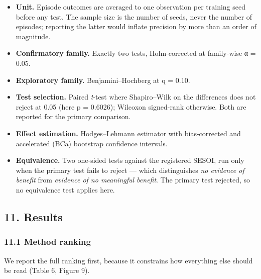 \documentclass[
]{article}
\providecommand{\tightlist}{%
  \setlength{\itemsep}{0pt}\setlength{\parskip}{0pt}}
\begin{document}
\begin{itemize}
\tightlist
\item
  \textbf{Unit.} Episode outcomes are averaged to one observation per
  training seed before any test. The sample size is the number of seeds,
  never the number of episodes; reporting the latter would inflate
  precision by more than an order of magnitude.
\item
  \textbf{Confirmatory family.} Exactly two tests, Holm-corrected at
  family-wise α = 0.05.
\item
  \textbf{Exploratory family.} Benjamini--Hochberg at q = 0.10.
\item
  \textbf{Test selection.} Paired \emph{t}-test where Shapiro--Wilk on
  the differences does not reject at 0.05 (here p = 0.6026); Wilcoxon
  signed-rank otherwise. Both are reported for the primary comparison.
\item
  \textbf{Effect estimation.} Hodges--Lehmann estimator with
  bias-corrected and accelerated (BCa) bootstrap confidence intervals.
\item
  \textbf{Equivalence.} Two one-sided tests against the registered
  SESOI, run only when the primary test fails to reject --- which
  distinguishes \emph{no evidence of benefit} from \emph{evidence of no
  meaningful benefit}. The primary test rejected, so no equivalence test
  applies here.
\end{itemize}

\subsection{11. Results}\label{11-results}

\subsubsection{11.1 Method ranking}\label{111-method-ranking}

We report the full ranking first, because it constrains how everything
else should be read (Table 6, Figure 9).
\end{document}
